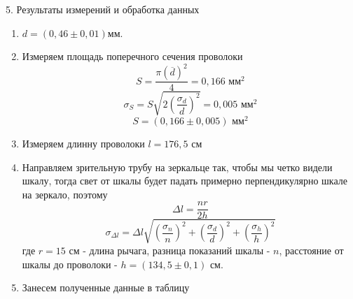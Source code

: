 \documentclass[12pt, a4paper]{article}
\begin{document}
\vspace*{0.3cm}
{\Large 5. Результаты измерений и обработка данных \\} 

\begin{enumerate}
    \item $d = (0,46 \pm 0,01) \text{мм}$.
    \item Измеряем площадь поперечного сечения проволоки
    \[S =\dfrac{ \pi (\overline{d})^2}{4} = 0,166 \text{ мм}^2\]
    \[\sigma_S = S\sqrt{2\left( \dfrac{\sigma_d}{d}\right) ^2} = 0,005 \text{ мм}^2\]
    \[S = (0,166\pm0,005) \text{ мм}^2\]
    \item Измеряем длинну проволоки $l = 176,5  \text{ см}$
    \item Направляем зрительную трубу на зеркальце так, чтобы мы четко видели шкалу, тогда свет от шкалы будет падать примерно перпендикулярно шкале на зеркало, поэтому
    \[\Delta l =\dfrac{nr}{2h}\]
    \[ \sigma_{\Delta l} = \Delta l\sqrt{\left( \dfrac{\sigma_{n}}{n}\right)^2 + \left(\dfrac{\sigma_d}{d}\right)^2+\left(\dfrac{\sigma_h}{h}\right)^2} \]
    где $r = 15$ см - длина рычага, разница показаний шкалы - $n$, расстояние от шкалы до проволоки - $h = (134,5\pm0,1)\text{ см}$.
    \item Занесем полученные данные в таблицу 
    
    \begin{table}
        \caption{Зависимость удлинения проволоки от нагрузки}
    \end{table}


\end{enumerate}
\end{document}
